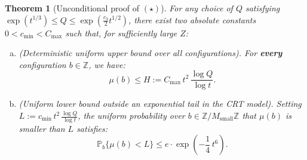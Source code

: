 \documentclass[11pt, a4paper]{article}
\theoremstyle{plain}
\newtheorem{theorem}{Theorem}[section]
\theoremstyle{definition}
\newcommand{\Z}{\mathbb{Z}}
\newcommand{\Pbb}{\mathbb{P}}
\begin{document}
\begin{theorem}[Unconditional proof of $(\star)$]\label{thm:star_inconditionnel}
For any choice of $Q$ satisfying $\exp(t^{1/3}) \le Q \le \exp(\frac{c_3}{2} t^{1/2})$, there exist two absolute constants $0 < c_{\min} < C_{\max}$ such that, for sufficiently large $Z$:
\begin{enumerate}[(a)]
    \item \emph{(Deterministic uniform upper bound over all configurations).} For \textbf{every} configuration $b \in \Z$, we have:
    \begin{equation}\label{eq:borne_H_uniforme}
    \mu(b) \le H := C_{\max}\,t^2\,\frac{\log Q}{\log t}.
    \end{equation}
    \item \emph{(Uniform lower bound outside an exponential tail in the CRT model).} Setting $L :=\allowbreak c_{\min}\,t^2\allowbreak\,\frac{\log Q}{\log t}$, the uniform probability over $b \in \Z / M_{\mathrm{small}} \Z$ that $\mu(b)$ is smaller than $L$ satisfies:
    \begin{equation}\label{eq:borne_queue_CRT_star}
    \Pbb_b\big\{ \mu(b) < L \big\} \le e \cdot \exp\!\left(-\frac{1}{4}\,t^6\right). \tag{$\star$}
    \end{equation}
\end{enumerate}
\end{theorem}
\end{document}
